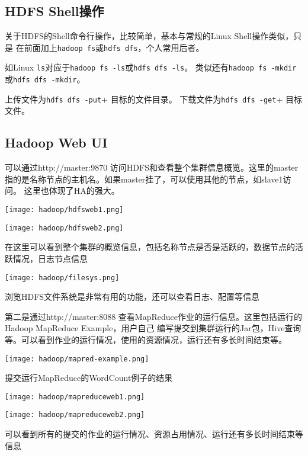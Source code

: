 \subsection{HDFS Shell操作}

关于HDFS的Shell命令行操作，比较简单，基本与常规的Linux Shell操作类似，只是
在前面加上\lstinline{hadoop fs}或\lstinline{hdfs dfs}，个人常用后者。

如Linux \lstinline{ls}对应于\lstinline{hadoop fs -ls}或\lstinline{hdfs dfs -ls}。
类似还有\lstinline{hadoop fs -mkdir}或\lstinline{hdfs dfs -mkdir}。

上传文件为\lstinline{hdfs dfs -put}+ 目标的文件目录。
下载文件为\lstinline{hdfs dfs -get}+ 目标文件。

\label{subsec:hadoop_web}

\subsection{Hadoop Web UI}
可以通过http://master:9870 访问HDFS和查看整个集群信息概览。这里的master指的是名称节点的主机名。如果master挂了，可以使用其他的节点，如slave1访问。
这里也体现了HA的强大。

\begin{center}
	\texttt{[image: hadoop/hdfsweb1.png]}
	
	\texttt{[image: hadoop/hdfsweb2.png]}

	在这里可以看到整个集群的概览信息，包括名称节点是否是活跃的，数据节点的活跃情况，日志节点信息

	\texttt{[image: hadoop/filesys.png]}
	
	浏览HDFS文件系统是非常有用的功能，还可以查看日志、配置等信息
\end{center}

第二是通过http://master:8088 查看MapReduce作业的运行信息。这里包括运行的Hadoop MapReduce Example，用户自己
编写提交到集群运行的Jar包，Hive查询等。可以看到作业的运行情况，使用的资源情况，运行还有多长时间结束等。

\begin{center}
	\texttt{[image: hadoop/mapred-example.png]}
	
	提交运行MapReduce的WordCount例子的结果

	\texttt{[image: hadoop/mapreduceweb1.png]}

	\texttt{[image: hadoop/mapreduceweb2.png]}
	
	可以看到所有的提交的作业的运行情况、资源占用情况、运行还有多长时间结束等信息
\end{center}

